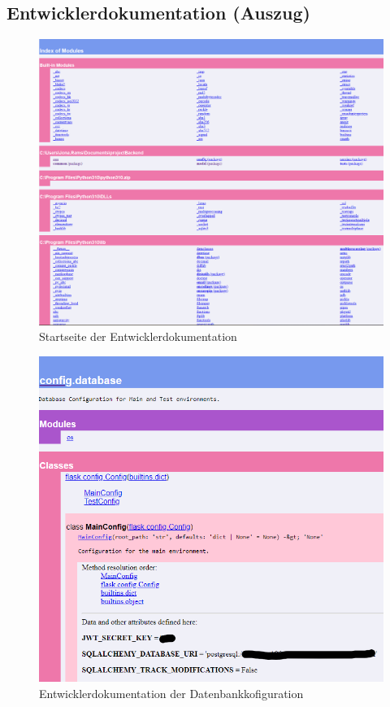 \documentclass[a4paper,12pt]{article}
\begin{document}
\clearpage
\subsection{Entwicklerdokumentation (Auszug)}
\label{sec:entwicklerdokumentation}

\begin{figure}[h]
\centering
\includegraphics[width=1\textwidth]{bilder/entwicklerdokumentation.png}
\caption{Startseite der Entwicklerdokumentation}
\end{figure}

\begin{figure}[h]
\centering
\includegraphics[width=1\textwidth]{bilder/databasedoku.png}
\caption{Entwicklerdokumentation der Datenbankkofiguration}
\end{figure}
\end{document}
